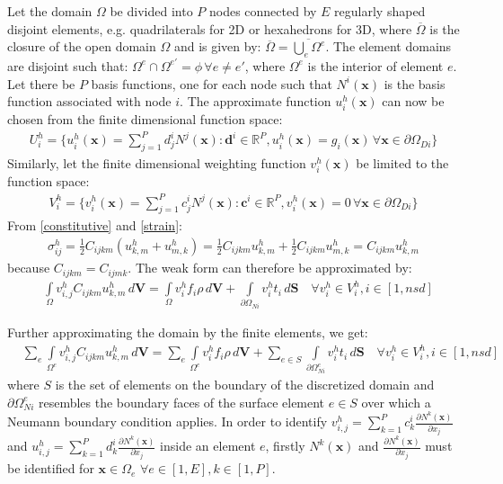 	Let the domain $\Omega$ be divided into $P$ nodes connected by $E$ regularly shaped disjoint elements, e.g. quadrilaterals for 2D or hexahedrons for 3D, where $\overline{\Omega}$ is the closure of the open domain $\Omega$ and is given by: $\overline{\Omega} = \overline{\bigcup_{e} \Omega^e}$. The element domains are disjoint such that: $\Omega^e \cap \Omega^{e'} = \phi \, \forall e \neq e'$, where $\Omega^e$ is the interior of element $e$. Let there be $P$ basis functions, one for each node such that $N^i(\bm{x})$ is the basis function associated with node $i$. The approximate function $u^h_i(\bm{x})$ can now be chosen from the finite dimensional function space:
	\begin{align}
	    U_i^h = \{u^h_i(\bm{x}) = \sum_{j=1}^Pd^i_jN^j(\bm{x}):\bm{d}^i\in\mathbb{R}^{P}, u_i^h(\bm{x}) = g_i(\bm{x}) \, \forall \bm{x} \in \partial \Omega_{Di}\}
	\end{align} Similarly, let the finite dimensional weighting function $v_i^h(\bm{x})$ be limited to the function space:
	\begin{align}
	    V_i^h = \{v^h_i(\bm{x}) = \sum_{j=1}^Pc^i_jN^j(\bm{x}): \bm{c}^i\in\mathbb{R}^{P}, v_i^h(\bm{x}) = 0 \, \forall \bm{x} \in \partial \Omega_{Di}\}
    \end{align}
	From \ref{constitutive} and \ref{strain}:
	\begin{align}
	    \sigma^h_{ij} = \frac{1}{2}C_{ijkm}(u^h_{k,m} + u^h_{m,k}) = \frac{1}{2}C_{ijkm}u^h_{k,m} + \frac{1}{2}C_{ijkm}u^h_{m,k} = C_{ijkm}u^h_{k,m}
	\end{align}
	because $C_{ijkm} = C_{ijmk}$. The weak form can therefore be approximated by:
	\begin{align}
		& \int\limits_{\Omega} v^h_{i,j}C_{ijkm}u^h_{k,m} \,d\bm{V} = \int\limits_{\Omega} v^h_i f_i \rho\,d\bm{V} + \int\limits_{\partial \Omega_{Ni}} v^h_it_i \,d\bm{S} \quad \forall v^h_i \in V^h_i, i \in [1,nsd]
	\end{align}

	Further approximating the domain by the finite elements, we get:
	\begin{align}
		& \sum_e \int\limits_{\Omega^e} v^h_{i,j}C_{ijkm}u^h_{k,m} \,d\bm{V} = \sum_e \int\limits_{\Omega^e} v^h_i f_i \rho\,d\bm{V} + \sum_{e \in S} \int\limits_{\partial \Omega^e_{Ni}} v^h_it_i \,d\bm{S} \quad \forall v^h_i \in V^h_i, i \in [1,nsd] 
	\end{align}
	where $S$ is the set of elements on the boundary of the discretized domain and $\partial \Omega^e_{Ni}$ resembles the boundary faces of the surface element $e \in S$ over which a Neumann boundary condition applies. In order to identify $v^h_{i,j} = \sum_{k=1}^Pc^i_k\frac{\partial N^k(\bm{x})}{\partial x_j}$ and $u^h_{i,j} = \sum_{k=1}^Pd^i_k\frac{\partial N^k(\bm{x})}{\partial x_j}$ inside an element $e$, firstly $N^k(\bm{x})$ and $\frac{\partial N^k(\bm{x})}{\partial x_j}$ must be identified for $\bm{x} \in \Omega_e$ $\forall e \in [1,E], k \in [1,P]$.

